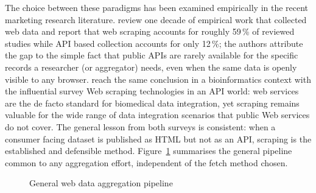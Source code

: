 The choice between these paradigms has been examined empirically in the recent marketing research literature. \textcite{BoegershausenDatta2022} review one decade of empirical work that collected web data and report that web scraping accounts for roughly 59\,\% of reviewed studies while API based collection accounts for only 12\,\%; the authors attribute the gap to the simple fact that public APIs are rarely available for the specific records a researcher (or aggregator) needs, even when the same data is openly visible to any browser. \textcite{GlezPena2014} reach the same conclusion in a bioinformatics context with the influential survey \guillemotleft{}Web scraping technologies in an API world\guillemotright{}: web services are the de facto standard for biomedical data integration, yet scraping remains valuable for the wide range of data integration scenarios that public Web services do not cover. The general lesson from both surveys is consistent: when a consumer facing dataset is published as HTML but not as an API, scraping is the established and defensible method. Figure~\ref{fig:aggregation-pipeline} summarises the general pipeline common to any aggregation effort, independent of the fetch method chosen.

\begin{figure}[H]
\centering
{}
\caption{General web data aggregation pipeline}
\label{fig:aggregation-pipeline}
\end{figure}

